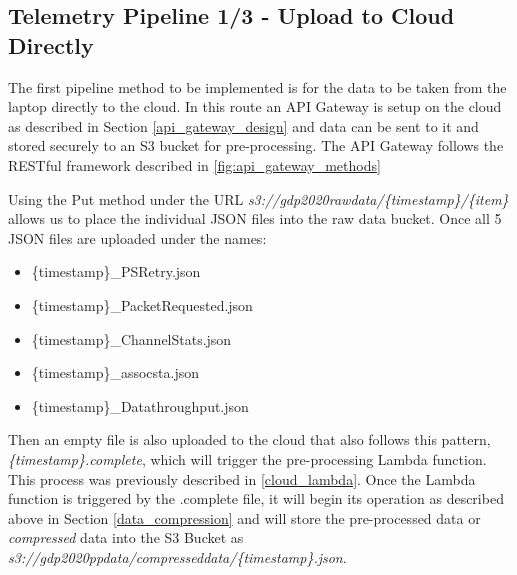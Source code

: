 \subsection{Telemetry Pipeline 1/3 - Upload to Cloud Directly} \label{Section:pipeline1/3}
The first pipeline method to be implemented is for the data to be taken from the laptop directly to the cloud. In this route an API Gateway is setup on the cloud as described in Section \ref{api_gateway_design}
and data can be sent to it and stored securely to an S3 bucket for pre-processing. The API Gateway follows the RESTful framework described in \ref{fig:api_gateway_methods}



Using the Put method under the URL \textit{s3://gdp2020rawdata/\{timestamp\}/\{item\}} allows us to place the individual JSON files into the raw data bucket. Once all 5 JSON files are uploaded under the names:
\begin{itemize}
    \item \{timestamp\}\_PSRetry.json
    \item \{timestamp\}\_PacketRequested.json
    \item \{timestamp\}\_ChannelStats.json
    \item \{timestamp\}\_assocsta.json
    \item \{timestamp\}\_Datathroughput.json
\end{itemize}
Then an empty file is also uploaded to the cloud that also follows this pattern,\\ 
\textit{\{timestamp\}.complete}, which will trigger the pre-processing Lambda function. This process was previously described in \ref{cloud_lambda}. Once the Lambda function is triggered by the .complete file, it will begin its operation as described above in Section \ref{data_compression} and will store the pre-processed data or \textit{compressed} data into the S3 Bucket as \\\textit{s3://gdp2020ppdata/compresseddata/\{timestamp\}.json}.


